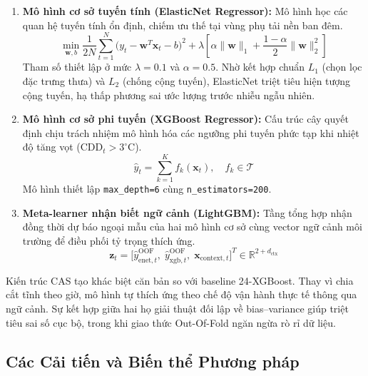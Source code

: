 \begin{enumerate}
    \item \textbf{Mô hình cơ sở tuyến tính (ElasticNet Regressor):} Mô hình học các quan hệ tuyến tính ổn định, chiếm ưu thế tại vùng phụ tải nền ban đêm.
    \begin{equation}
        \min_{\mathbf{w}, b} \frac{1}{2N} \sum_{t=1}^N \Big(y_t - \mathbf{w}^T \mathbf{x}_t - b\Big)^2 + \lambda \left[ \alpha \|\mathbf{w}\|_1 + \frac{1 - \alpha}{2} \|\mathbf{w}\|_2^2 \right]
    \end{equation}
    Tham số thiết lập ở mức $\lambda = 0.1$ và $\alpha = 0.5$. Nhờ kết hợp chuẩn $L_1$ (chọn lọc đặc trưng thưa) và $L_2$ (chống cộng tuyến), ElasticNet triệt tiêu hiện tượng cộng tuyến, hạ thấp phương sai ước lượng trước nhiễu ngẫu nhiên.

    \item \textbf{Mô hình cơ sở phi tuyến (XGBoost Regressor):} Cấu trúc cây quyết định chịu trách nhiệm mô hình hóa các ngưỡng phi tuyến phức tạp khi nhiệt độ tăng vọt ($\text{CDD}_t > 3^\circ\text{C}$).
    \begin{equation}
        \hat{y}_t = \sum_{k=1}^K f_k(\mathbf{x}_t), \quad f_k \in \mathcal{T}
    \end{equation}
    Mô hình thiết lập \texttt{max\_depth=6} cùng \texttt{n\_estimators=200}.

    \item \textbf{Meta-learner nhận biết ngữ cảnh (LightGBM):} Tầng tổng hợp nhận đồng thời dự báo ngoại mẫu của hai mô hình cơ sở cùng vector ngữ cảnh môi trường để điều phối tỷ trọng thích ứng.
    \begin{equation}
        \mathbf{z}_t = \Big[ \hat{y}_{\text{enet}, t}^{\text{OOF}},\; \hat{y}_{\text{xgb}, t}^{\text{OOF}},\; \mathbf{x}_{\text{context}, t} \Big]^T \in \mathbb{R}^{2 + d_{\text{ctx}}}
    \end{equation}
\end{enumerate}

Kiến trúc CAS tạo khác biệt căn bản so với baseline 24-XGBoost. Thay vì chia cắt tĩnh theo giờ, mô hình tự thích ứng theo chế độ vận hành thực tế thông qua ngữ cảnh. Sự kết hợp giữa hai họ giải thuật đối lập về bias--variance giúp triệt tiêu sai số cục bộ, trong khi giao thức Out-Of-Fold ngăn ngừa rò rỉ dữ liệu.

\subsection{Các Cải tiến và Biến thể Phương pháp}
\label{subsec:improvements}

